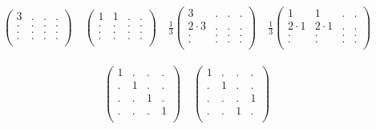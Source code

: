 \documentclass[12pt,a4paper]{amsart}
\begin{document}
\begin{align*}
\left(\begin{array}{rrrr}
3&.&.&.\\
.&.&.&.\\
.&.&.&.\\
.&.&.&.\\
\end{array}\right)
\quad
\left(\begin{array}{rrrr}
1&1&.&.\\
.&.&.&.\\
.&.&.&.\\
.&.&.&.\\
\end{array}\right)
\quad
\frac13\left(\begin{array}{rrrr}
3&.&.&.\\
2\cdot3&.&.&.\\
.&.&.&.\\
.&.&.&.\\
\end{array}\right)
\quad
\frac13\left(\begin{array}{rrrr}
1&1&.&.\\
2\cdot1&2\cdot1&.&.\\
.&.&.&.\\
.&.&.&.\\
\end{array}\right)
\end{align*}

\begin{align*}
\left(\begin{array}{rrrr}
1&.&.&.\\
.&1&.&.\\
.&.&1&.\\
.&.&.&1\\
\end{array}\right)
\quad
\left(\begin{array}{rrrr}
1&.&.&.\\
.&1&.&.\\
.&.&.&1\\
.&.&1&.\\
\end{array}\right)
\end{align*}
\end{document}
